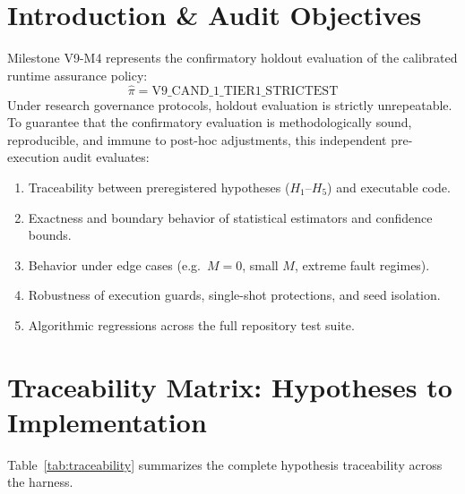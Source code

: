 \documentclass[10pt,a4paper]{article}
\begin{document}
\section{Introduction \& Audit Objectives}
Milestone V9-M4 represents the confirmatory holdout evaluation of the calibrated runtime assurance policy:
\begin{equation}
\hat{\pi} = \text{V9\_CAND\_1\_TIER1\_STRICTEST}
\end{equation}
Under research governance protocols, holdout evaluation is strictly unrepeatable. To guarantee that the confirmatory evaluation is methodologically sound, reproducible, and immune to post-hoc adjustments, this independent pre-execution audit evaluates:
\begin{enumerate}
    \item Traceability between preregistered hypotheses ($H_1$–$H_5$) and executable code.
    \item Exactness and boundary behavior of statistical estimators and confidence bounds.
    \item Behavior under edge cases (e.g.\ $M=0$, small $M$, extreme fault regimes).
    \item Robustness of execution guards, single-shot protections, and seed isolation.
    \item Algorithmic regressions across the full repository test suite.
\end{enumerate}

\section{Traceability Matrix: Hypotheses to Implementation}
Table~\ref{tab:traceability} summarizes the complete hypothesis traceability across the harness.
\end{document}
